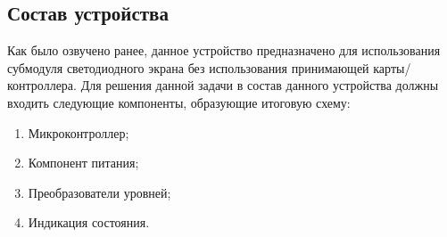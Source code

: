 \subsection{Состав устройства}

Как было озвучено ранее, данное устройство предназначено для использования субмодуля светодиодного экрана без использования принимающей карты/контроллера. Для решения данной задачи в состав данного устройства должны входить следующие компоненты, образующие итоговую схему:
\begin{enumerate}
    \item Микроконтроллер;
    \item Компонент питания;
    \item Преобразователи уровней;
    \item Индикация состояния.
\end{enumerate}